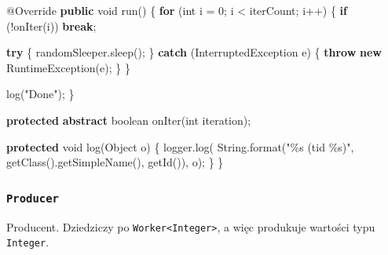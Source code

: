 \documentclass[11pt]{article}
\newenvironment{Shaded}{}{}
\newcommand{\KeywordTok}[1]{\textcolor[rgb]{0.00,0.44,0.13}{\textbf{{#1}}}}
\newcommand{\DataTypeTok}[1]{\textcolor[rgb]{0.56,0.13,0.00}{{#1}}}
\newcommand{\DecValTok}[1]{\textcolor[rgb]{0.25,0.63,0.44}{{#1}}}
\newcommand{\StringTok}[1]{\textcolor[rgb]{0.25,0.44,0.63}{{#1}}}
\newcommand{\FunctionTok}[1]{\textcolor[rgb]{0.02,0.16,0.49}{{#1}}}
\newcommand{\NormalTok}[1]{{#1}}
\newcommand{\SpecialCharTok}[1]{\textcolor[rgb]{0.25,0.44,0.63}{{#1}}}
\newcommand{\ControlFlowTok}[1]{\textcolor[rgb]{0.00,0.44,0.13}{\textbf{{#1}}}}
\newcommand{\OperatorTok}[1]{\textcolor[rgb]{0.40,0.40,0.40}{{#1}}}
\newcommand{\BuiltInTok}[1]{{#1}}
\newcommand{\AttributeTok}[1]{\textcolor[rgb]{0.49,0.56,0.16}{{#1}}}
\begin{document}
\begin{Shaded}
\begin{Highlighting}[]
    \AttributeTok{@Override}
    \KeywordTok{public} \DataTypeTok{void} \FunctionTok{run}\OperatorTok{()} \OperatorTok{\{}
        \ControlFlowTok{for} \OperatorTok{(}\DataTypeTok{int}\NormalTok{ i }\OperatorTok{=} \DecValTok{0}\OperatorTok{;}\NormalTok{ i }\OperatorTok{\textless{}}\NormalTok{ iterCount}\OperatorTok{;}\NormalTok{ i}\OperatorTok{++)} \OperatorTok{\{}
            \ControlFlowTok{if} \OperatorTok{(!}\FunctionTok{onIter}\OperatorTok{(}\NormalTok{i}\OperatorTok{))}
                \ControlFlowTok{break}\OperatorTok{;}

            \ControlFlowTok{try} \OperatorTok{\{}
\NormalTok{                randomSleeper}\OperatorTok{.}\FunctionTok{sleep}\OperatorTok{();}
            \OperatorTok{\}} \ControlFlowTok{catch} \OperatorTok{(}\BuiltInTok{InterruptedException}\NormalTok{ e}\OperatorTok{)} \OperatorTok{\{}
                \ControlFlowTok{throw} \KeywordTok{new} \BuiltInTok{RuntimeException}\OperatorTok{(}\NormalTok{e}\OperatorTok{);}
            \OperatorTok{\}}
        \OperatorTok{\}}

        \FunctionTok{log}\OperatorTok{(}\StringTok{"Done"}\OperatorTok{);}
    \OperatorTok{\}}

    \KeywordTok{protected} \KeywordTok{abstract} \DataTypeTok{boolean} \FunctionTok{onIter}\OperatorTok{(}\DataTypeTok{int}\NormalTok{ iteration}\OperatorTok{);}

    \KeywordTok{protected} \DataTypeTok{void} \FunctionTok{log}\OperatorTok{(}\BuiltInTok{Object}\NormalTok{ o}\OperatorTok{)} \OperatorTok{\{}
\NormalTok{        logger}\OperatorTok{.}\FunctionTok{log}\OperatorTok{(}
            \BuiltInTok{String}\OperatorTok{.}\FunctionTok{format}\OperatorTok{(}\StringTok{"}\SpecialCharTok{\%s}\StringTok{ (tid }\SpecialCharTok{\%s}\StringTok{)"}\OperatorTok{,} \FunctionTok{getClass}\OperatorTok{().}\FunctionTok{getSimpleName}\OperatorTok{(),} \FunctionTok{getId}\OperatorTok{()),}\NormalTok{ o}\OperatorTok{);}
    \OperatorTok{\}}
\OperatorTok{\}}
\end{Highlighting}
\end{Shaded}

    \hypertarget{producer}{%
\subsubsection{\texorpdfstring{\texttt{Producer}}{Producer}}\label{producer}}

Producent. Dziedziczy po
\texttt{Worker\textless{}Integer\textgreater{}}, a więc produkuje
wartości typu \texttt{Integer}.
\end{document}
